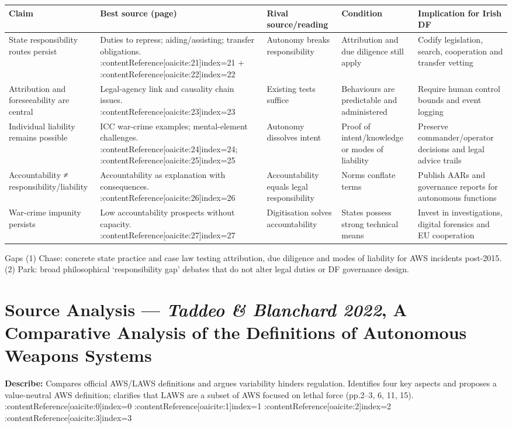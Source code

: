 \begin{tabular}{p{3.2cm}p{4.2cm}p{3.6cm}p{3.2cm}p{4.2cm}}
	\textbf{Claim} & \textbf{Best source (page)} & \textbf{Rival source/reading} & \textbf{Condition} & \textbf{Implication for Irish DF}\\\hline
	State responsibility routes persist & Duties to repress; aiding/assisting; transfer obligations. {\small :contentReference[oaicite:21]{index=21} {\tiny +} :contentReference[oaicite:22]{index=22}} & Autonomy breaks responsibility & Attribution and due diligence still apply & Codify legislation, search, cooperation and transfer vetting \\
	Attribution and foreseeability are central & Legal-agency link and causality chain issues. {\small :contentReference[oaicite:23]{index=23}} & Existing tests suffice & Behaviours are predictable and administered & Require human control bounds and event logging \\
	Individual liability remains possible & ICC war-crime examples; mental-element challenges. {\small :contentReference[oaicite:24]{index=24}; :contentReference[oaicite:25]{index=25}} & Autonomy dissolves intent & Proof of intent/knowledge or modes of liability & Preserve commander/operator decisions and legal advice trails \\
	Accountability ≠ responsibility/liability & Accountability as explanation with consequences. {\small :contentReference[oaicite:26]{index=26}} & Accountability equals legal responsibility & Norms conflate terms & Publish AARs and governance reports for autonomous functions \\
	War-crime impunity persists & Low accountability prospects without capacity. {\small :contentReference[oaicite:27]{index=27}} & Digitisation solves accountability & States possess strong technical means & Invest in investigations, digital forensics and EU cooperation \\\hline
\end{tabular}

Gaps
(1) Chase: concrete state practice and case law testing attribution, due diligence and modes of liability for AWS incidents post-2015.
(2) Park: broad philosophical ‘responsibility gap’ debates that do not alter legal duties or DF governance design.

\parencite{TADDEO_2022}

\section*{Source Analysis — \textit{Taddeo \& Blanchard 2022}, A Comparative Analysis of the Definitions of Autonomous Weapons Systems}
\textbf{Describe:} Compares official AWS/LAWS definitions and argues variability hinders regulation. Identifies four key aspects and proposes a value-neutral AWS definition; clarifies that LAWS are a subset of AWS focused on lethal force (pp.2–3, 6, 11, 15). :contentReference[oaicite:0]{index=0} :contentReference[oaicite:1]{index=1} :contentReference[oaicite:2]{index=2} :contentReference[oaicite:3]{index=3}

